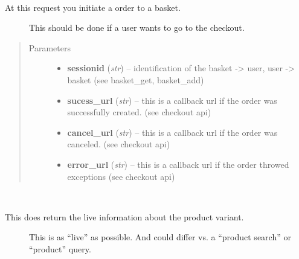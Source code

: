 \documentclass[letterpaper,10pt,english]{sphinxmanual}
\begin{document}
\begin{fulllineitems}
\begin{fulllineitems}
\begin{quote}
\begin{description}
\end{description}\end{quote}

\end{fulllineitems}


\begin{fulllineitems}
\label{collins:collins.Collins.initiateorder}~\begin{description}
\item[{At this request you initiate a order to a basket.}] \leavevmode
This should be done if a user wants to go to the checkout.

\end{description}
\begin{quote}\begin{description}
\item[{Parameters}] \leavevmode\begin{itemize}
\item {} 
\textbf{sessionid} (\emph{str}) -- identification of the basket -\textgreater{} user,
user -\textgreater{} basket (see basket\_get, basket\_add)

\item {} 
\textbf{sucess\_url} (\emph{str}) -- this is a callback url if the order was
successfully created. (see checkout api)

\item {} 
\textbf{cancel\_url} (\emph{str}) -- this is a callback url if the order was
canceled. (see checkout api)

\item {} 
\textbf{error\_url} (\emph{str}) -- this is a callback url if the order throwed
exceptions (see checkout api)

\end{itemize}

\end{description}\end{quote}

\end{fulllineitems}


\begin{fulllineitems}
\label{collins:collins.Collins.livevariant}~\begin{description}
\item[{This does return the live information about the product variant.}] \leavevmode
This is as ``live'' as possible.
And could differ vs. a ``product search'' or ``product'' query.


\end{description}
\end{fulllineitems}
\end{fulllineitems}
\end{document}
